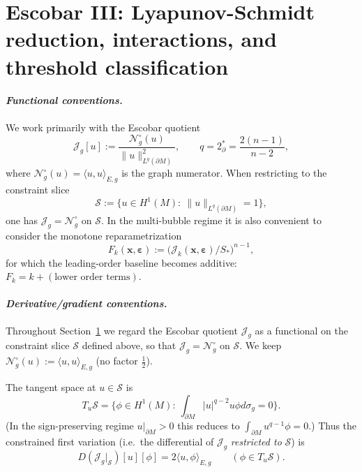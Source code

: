 \documentclass[11pt,reqno,a4paper]{amsart}
\numberwithin{equation}{section}
\theoremstyle{plain}
\theoremstyle{remark}
\theoremstyle{plain}
\begin{document}
\section{Escobar III: Lyapunov-Schmidt reduction, interactions, and threshold classification}
\label{sec:reduced}

\paragraph{\emph{Functional conventions.}}
We work primarily with the Escobar quotient
\[
\mathcal J_g[u]:=\frac{\mathcal N_g^\circ(u)}{\|u\|_{L^q(\partial M)}^{2}},
\qquad q=2_\partial^\ast=\frac{2(n-1)}{n-2},
\]
where $\mathcal N_g^\circ(u)=\langle u,u\rangle_{E,g}$ is the graph numerator. When restricting to the
constraint slice
\[
\mathcal S:=\{u\in H^1(M):\ \|u\|_{L^q(\partial M)}=1\},
\]
one has $\mathcal J_g=\mathcal N_g^\circ$ on $\mathcal S$. In the multi-bubble regime it is also convenient
to consider the monotone reparametrization
\[
F_k(\mathbf x,\boldsymbol\varepsilon):=\Big(\mathcal J_k(\mathbf x,\boldsymbol\varepsilon)/S_\ast\Big)^{n-1},
\]
for which the leading-order baseline becomes additive: $F_k=k+(\text{lower order terms})$.

\paragraph{\emph{Derivative/gradient conventions.}}
Throughout Section~\ref{sec:reduced} we regard the Escobar quotient $\mathcal J_g$ as a functional on the
constraint slice $\mathcal S$ defined above,
so that $\mathcal J_g=\mathcal N_g^\circ$ on $\mathcal S$.
We keep $\mathcal N_g^\circ(u):=\langle u,u\rangle_{E,g}$ (no factor $\tfrac12$).

The tangent space at $u\in\mathcal S$ is
\[
T_u\mathcal S=\Big\{\phi\in H^1(M):\ \int_{\partial M}|u|^{q-2}u\phi d\sigma_g=0\Big\}.
\]
(In the sign-preserving regime $u|_{\partial M}>0$ this reduces to $\int_{\partial M}u^{q-1}\phi=0$.)
Thus the constrained first variation (i.e.\ the differential of $\mathcal J_g$ \emph{restricted to} $\mathcal S$) is
\begin{equation}\label{eq:DJ-slice-conv}
D(\mathcal J_g|_{\mathcal S})[u][\phi]
=2\langle u,\phi\rangle_{E,g}
\qquad(\phi\in T_u\mathcal S).
\end{equation}
\end{document}
